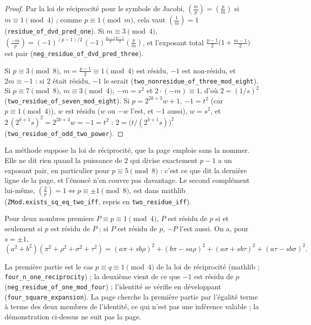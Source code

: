 \begin{proof}
Par la loi de réciprocité pour le symbole de Jacobi, $\left(\frac{m}{p}\right) = \left(\frac{p}{m}\right)$ si $m \equiv 1 \pmod 4$ ; comme $p \equiv 1 \pmod m$, cela vaut $\left(\frac{1}{m}\right) = 1$ (\texttt{residue\_of\_dvd\_pred\_one}). Si $m \equiv 3 \pmod 4$, $\left(\frac{-m}{p}\right) = (-1)^{(p-1)/2}\,(-1)^{\frac{m-1}{2}\frac{p-1}{2}}\left(\frac{p}{m}\right)$, et l'exposant total $\frac{p-1}{2}\bigl(1 + \frac{m-1}{2}\bigr)$ est pair (\texttt{neg\_residue\_of\_dvd\_pred\_three}).

Si $p \equiv 3 \pmod 8$, $m = \frac{p-1}{2} \equiv 1 \pmod 4$ est résidu, $-1$ est non-résidu, et $2m \equiv -1$ : si $2$ était résidu, $-1$ le serait (\texttt{two\_nonresidue\_of\_three\_mod\_eight}). Si $p \equiv 7 \pmod 8$, $m \equiv 3 \pmod 4$, $-m = s^2$ et $2 \cdot (-m) \equiv 1$, d'où $2 = (1/s)^2$ (\texttt{two\_residue\_of\_seven\_mod\_eight}). Si $p = 2^{2k+3}w + 1$, $-1 = t^2$ (car $p \equiv 1 \pmod 4$), $w$ est résidu ($w$ ou $-w$ l'est, et $-1$ aussi), $w = s^2$, et $2\,(2^{k+1}s)^2 = 2^{2k+3}w = -1 = t^2$ : $2 = \bigl(t/(2^{k+1}s)\bigr)^2$ (\texttt{two\_residue\_of\_odd\_two\_power}).
\end{proof}

\begin{remarque}
La méthode suppose la loi de réciprocité, que la page emploie sans la nommer. Elle ne dit rien quand la puissance de $2$ qui divise exactement $p - 1$ a un exposant pair, en particulier pour $p \equiv 5 \pmod 8$ : c'est ce que dit la dernière ligne de la page, et l'énoncé n'en couvre pas davantage. Le second complément lui-même, $\left(\frac{2}{p}\right) = 1 \iff p \equiv \pm 1 \pmod 8$, est dans mathlib (\texttt{ZMod.exists\_sq\_eq\_two\_iff}, repris en \texttt{two\_residue\_iff}).
\end{remarque}

\begin{enonce}
Pour deux nombres premiers $P \equiv p \equiv 1 \pmod 4$, $P$ est résidu de $p$ si et seulement si $p$ est résidu de $P$ ; si $P$ est résidu de $p$, $-P$ l'est aussi. On a, pour $s = \pm 1$,
\[ (a^2+b^2)(\pi^2+\rho^2+\sigma^2+\tau^2) = (a\pi + sb\rho)^2 + (b\pi - sa\rho)^2 + (a\sigma + sb\tau)^2 + (a\tau - sb\sigma)^2. \]
\end{enonce}

La première partie est le cas $p \equiv q \equiv 1 \pmod 4$ de la loi de réciprocité (mathlib ; \texttt{four\_n\_one\_reciprocity}) ; la deuxième vient de ce que $-1$ est résidu de $p$ (\texttt{neg\_residue\_of\_one\_mod\_four}) ; l'identité se vérifie en développant (\texttt{four\_square\_expansion}). La page cherche la première partie par l'égalité terme à terme des deux membres de l'identité, ce qui n'est pas une inférence valable ; la démonstration ci-dessus ne suit pas la page.

